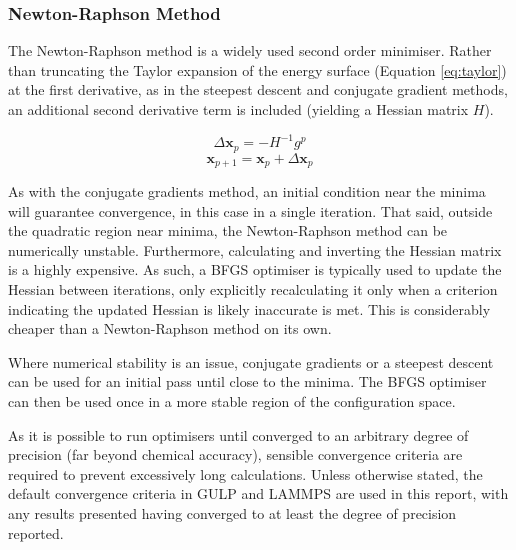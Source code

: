 \subsubsection{Newton-Raphson Method}
The Newton-Raphson method is a widely used second order minimiser.
Rather than truncating the Taylor expansion of the energy surface (Equation \ref{eq:taylor}) at the first derivative, as in the steepest descent and conjugate gradient methods, an additional second derivative term is included (yielding a Hessian matrix $H$).


\begin{equation}
\Delta \mathbf{x}_p = -H^{-1}g^p
\end{equation}
\begin{equation}
\mathbf{x}_{p+1} = \mathbf{x}_p + \Delta \mathbf{x}_p
\end{equation}

As with the conjugate gradients method, an initial condition near the minima will guarantee convergence, in this case in a single iteration.
That said, outside the quadratic region near minima, the Newton-Raphson method can be numerically unstable.
Furthermore, calculating and inverting the Hessian matrix is a highly expensive.
As such, a BFGS optimiser\cite{Shanno1970} is typically used to update the Hessian between iterations, only explicitly recalculating it only when a criterion indicating the updated Hessian is likely inaccurate is met.
This is considerably cheaper than a Newton-Raphson method on its own.

Where numerical stability is an issue, conjugate gradients or a steepest descent can be used for an initial pass until close to the minima.
The BFGS optimiser can then be used once in a more stable region of the configuration space.

As it is possible to run optimisers until converged to an arbitrary degree of precision (far beyond chemical accuracy), sensible convergence criteria are required to prevent excessively long calculations.
Unless otherwise stated, the default convergence criteria in GULP and LAMMPS are used in this report, with any results presented having converged to at least the degree of precision reported.

\newpage
